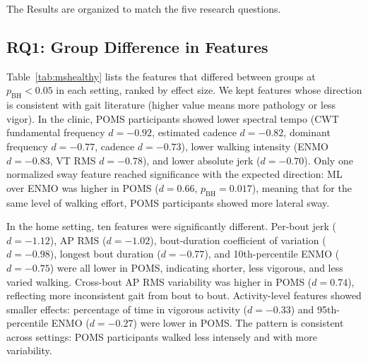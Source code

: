 \documentclass{article}
\begin{document}
The Results are organized to match the five research questions.

\subsection{RQ1: Group Difference in Features}\label{sec:rq1}

Table~\ref{tab:mshealthy} lists the features that differed between groups at $p_{\mathrm{BH}} < 0.05$ in each setting, ranked by effect size. We kept features whose direction is consistent with gait literature (higher value means more pathology or less vigor). In the clinic, POMS participants showed lower spectral tempo (CWT fundamental frequency $d = -0.92$, estimated cadence $d = -0.82$, dominant frequency $d = -0.77$, cadence $d = -0.73$), lower walking intensity (ENMO $d = -0.83$, VT RMS $d = -0.78$), and lower absolute jerk ($d = -0.70$). Only one normalized sway feature reached significance with the expected direction: ML over ENMO was higher in POMS ($d = 0.66$, $p_{\mathrm{BH}} = 0.017$), meaning that for the same level of walking effort, POMS participants showed more lateral sway.

In the home setting, ten features were significantly different. Per-bout jerk ($d = -1.12$), AP RMS ($d = -1.02$), bout-duration coefficient of variation ($d = -0.98$), longest bout duration ($d = -0.77$), and 10th-percentile ENMO ($d = -0.75$) were all lower in POMS, indicating shorter, less vigorous, and less varied walking. Cross-bout AP RMS variability was higher in POMS ($d = 0.74$), reflecting more inconsistent gait from bout to bout. Activity-level features showed smaller effects: percentage of time in vigorous activity ($d = -0.33$) and 95th-percentile ENMO ($d = -0.27$) were lower in POMS. The pattern is consistent across settings: POMS participants walked less intensely and with more variability.
\end{document}

